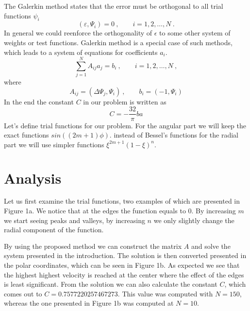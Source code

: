 \documentclass[12pt, a4paper]{article}
\begin{document}
The Galerkin method states that the error must be orthogonal to all trial functions $\psi_i$
\begin{equation*}
  (\varepsilon,\Psi_i) = 0 \>, \qquad  i = 1,2,\dots, N \>.
\end{equation*}
In general we could reenforce the orthogonality of $\epsilon$ to some other system of weights or test functions. Galerkin method is a special case of such methods, which leads to a system of equations for coefficients $a_i$.
\begin{equation*}
  \sum_{j=1}^N A_{ij} a_j = b_i\>, \qquad  i = 1,2,\dots, N \>,
  \label{eq:sistem}
\end{equation*}
where
\begin{equation*}
  A_{ij} = (\Delta \Psi_j,\Psi_i) \>, \qquad b_i = (-1,\Psi_i)
\end{equation*}
In the end the constant $C$ in our problem is written as
\begin{equation*}
  C = - \frac{32}{\pi}b a
\end{equation*}
Let's define trial functions for our problem. For the angular part we will keep the exact functions $sin((2m+1)\phi)$. instead of Bessel's functions for the radial part we will use simpler functions $\xi^{2m+1}(1-\xi)^n$.

\section{Analysis}
Let us first examine the trial functions, two examples of which are presented in Figure 1a. We notice that at the edges the function equals to $0$. By increasing $m$ we start seeing peaks and valleys, by increasing $n$ we only slightly change the radial component of the function.

By using the proposed method we can construct the matrix $A$ and solve the system presented in the introduction. The solution is then converted presented in the polar coordinates, which can be seen in Figure 1b. As expected we see that the highest highest velocity is reached at the center where the effect of the edges is least significant. From the solution we can also calculate the constant $C$, which comes out to $C = 0.7577220257467273$. This value was computed with $N = 150$, whereas the one presented in Figure 1b was computed at $N = 10$.
\end{document}
